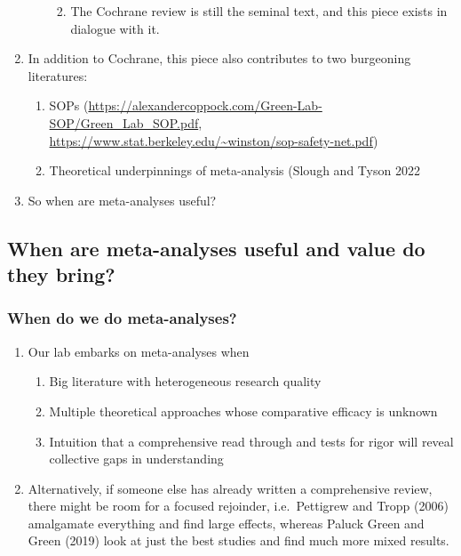 \documentclass[
  man]{apa6}
\providecommand{\tightlist}{%
  \setlength{\itemsep}{0pt}\setlength{\parskip}{0pt}}
\begin{document}
\begin{enumerate}
\begin{enumerate}
    \begin{enumerate}
    \def\labelenumiii{\arabic{enumiii}.}
    \setcounter{enumiii}{3}
    \tightlist
    \item
      The Cochrane review is still the seminal text, and this piece exists in dialogue with it.
    \end{enumerate}
  \end{enumerate}
\item
  In addition to Cochrane, this piece also contributes to two burgeoning literatures:

  \begin{enumerate}
  \def\labelenumii{\arabic{enumii}.}
  \setcounter{enumii}{2}
  \tightlist
  \item
    SOPs (\url{https://alexandercoppock.com/Green-Lab-SOP/Green_Lab_SOP.pdf}, \url{https://www.stat.berkeley.edu/~winston/sop-safety-net.pdf})
  \item
    Theoretical underpinnings of meta-analysis (Slough and Tyson 2022
  \end{enumerate}
\item
  So when are meta-analyses useful?
\end{enumerate}

\subsection{When are meta-analyses useful and value do they bring?}\label{when-are-meta-analyses-useful-and-value-do-they-bring}

\subsubsection{When do we do meta-analyses?}\label{when-do-we-do-meta-analyses}

\begin{enumerate}
\def\labelenumi{\arabic{enumi}.}
\tightlist
\item
  Our lab embarks on meta-analyses when

  \begin{enumerate}
  \def\labelenumii{\arabic{enumii}.}
  \tightlist
  \item
    Big literature with heterogeneous research quality
  \item
    Multiple theoretical approaches whose comparative efficacy is unknown
  \item
    Intuition that a comprehensive read through and tests for rigor will reveal collective gaps in understanding
  \end{enumerate}
\item
  Alternatively, if someone else has already written a comprehensive review, there might be room for a focused rejoinder, i.e.~Pettigrew and Tropp (2006) amalgamate everything and find large effects, whereas Paluck Green and Green (2019) look at just the best studies and find much more mixed results.
\end{enumerate}
\end{document}
